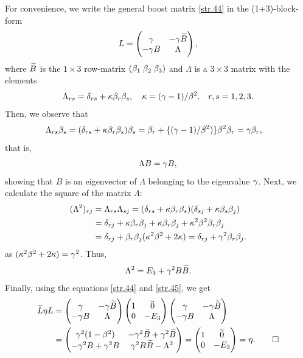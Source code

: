 \begin{small}
\soln For convenience, we write the general boost matrix
\eqref{str.44} in the (1+3)-block-form
\begin{align*}
L=\begin{pmatrix} {\gamma}& -{\gamma}\widetilde{B}\\
-{\gamma} B&\Lambda\end{pmatrix} ,
\end{align*}
where $\widetilde{B}$ is the $1\times3$ row-matrix $({\beta}_1\; 
{\beta}_2\;{\beta}_3)$ and $\Lambda$ is a $3\times3$ matrix with 
the elements
\begin{align*}
\Lambda_{rs}=\delta_{rs}
+\kappa{\beta}_r{\beta}_s,\quad \kappa
=({\gamma}-1)/{\beta}^2.\quad r,s=1,2,3.
\end{align*}
Then, we observe that
\begin{align*}
\Lambda_{rs}{\beta}_s
&=({\delta}_{rs} +\kappa{\beta}_r{\beta}_s){\beta}_s
={\beta}_{r}+\{({\gamma}-1)/{\beta}^2)\}
{\beta}^2{\beta}_{r}={\gamma}{\beta}_{r},
\end{align*}
that is,
\begin{align}  \label{str.45}
\Lambda B={\gamma} B,
\end{align}
showing that $B$ is an eigenvector of $\Lambda$ belonging 
to 
the eigenvalue ${\gamma}$. Next, we calculate the square of the 
matrix $\Lambda$:
\begin{align*}
(\Lambda^2)_{rj}&= \Lambda_{rs} \Lambda_{s j}
=({\delta}_{rs} +{\kappa}{\beta}_r{\beta}_s)
(\delta_{sj}+{\kappa}{\beta}_s{\beta}_j)\notag
\\&=\delta_{rj} +{\kappa}{\beta}_{r}{\beta}_{j}
+{\kappa}{\beta}_{r}{\beta}_{j}
+{\kappa}^2{\beta}^2{\beta}_{r}{\beta}_{j}\notag\\&=
{\delta}_{rj}+{\beta}_{r} {\beta}_{j}
({\kappa}^2{\beta}^2+2{\kappa})
={\delta}_{rj}+{\gamma}^2{\beta}_{r}{\beta}_{j}.
\end{align*}
as $({\kappa}^2{\beta}^2+2{\kappa})={\gamma}^2$. Thus,
\begin{align}\label{str.46}
\Lambda^2=E_3+{\gamma}^2B\widetilde{B}.
\end{align}
Finally, using the equations \eqref{str.44} and 
\eqref{str.45}, we get
\begin{align*}
\widetilde{L}{\eta} L&=\begin{pmatrix} {\gamma}& -{\gamma}\widetilde{B}\\
-{\gamma} B &\Lambda\end{pmatrix}
\begin{pmatrix} 1& \widetilde{0}\\ 0&-E_3\end{pmatrix}
\begin{pmatrix} {\gamma} &-{\gamma}\widetilde{B}\\
-{\gamma} B&\Lambda\end{pmatrix}  \\
&=\begin{pmatrix} 
{\gamma}^2(1-{\beta}^2)&-{\gamma}^2\widetilde{B}
+{\gamma}^2\widetilde{B}\\-{\gamma}^2B+{\gamma}^2
B&{\gamma}^2B\widetilde{B}
-\Lambda^2 \end{pmatrix}=
\begin{pmatrix} 1&\widetilde{0}\\ 
0& -E_3\end{pmatrix}={\eta}.\qquad \Box
\end{align*}


\end{small}
